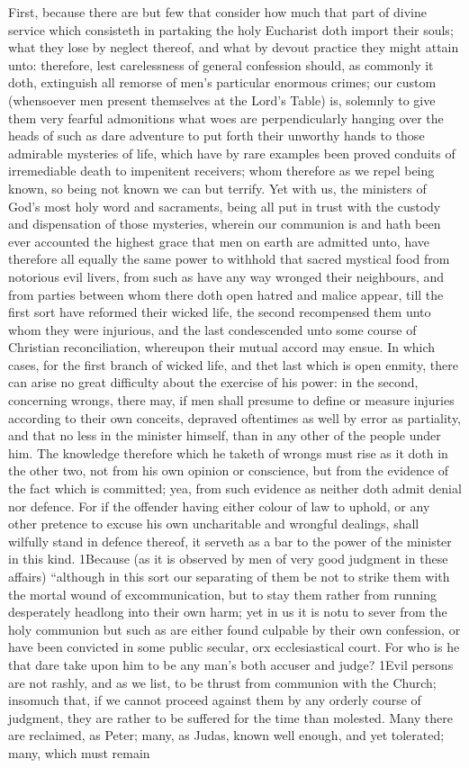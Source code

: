 First, because there are but few that consider how much that part of divine service which consisteth in partaking the holy Eucharist doth import their souls; what they lose by neglect thereof, and what by devout practice they might attain unto: therefore, lest carelessness of general confession  should, as commonly it doth, extinguish all remorse of men’s particular enormous crimes; our custom (whensoever men present themselves at the Lord’s Table) is, solemnly to give them very fearful admonitions what woes are perpendicularly hanging over the heads of such as dare adventure to put forth their unworthy hands to those admirable mysteries of life, which have by rare examples been proved conduits of irremediable death to impenitent receivers; whom therefore as we repel being known, so being not known we can but terrify. Yet with us, the ministers of God’s most holy word and sacraments, being all put in trust with the custody and dispensation of those mysteries, wherein our communion is and hath been ever accounted the highest grace that men on earth are admitted unto, have therefore all equally the same power to withhold that sacred mystical food from notorious evil livers, from such as have any way wronged their neighbours, and from parties between whom there doth open hatred and malice appear, till the first sort have reformed their wicked life, the second recompensed them unto whom they were injurious, and the last condescended unto some course of Christian reconciliation, whereupon their mutual accord may ensue. In which cases, for the first branch of wicked life, and thet last which is open enmity, there can arise no great difficulty about the exercise of his power: in the second, concerning wrongs, there may, if men shall presume to define or measure injuries according to their own conceits, depraved oftentimes as well by error as partiality, and that no less in the minister himself, than in any other of the people under him. The knowledge therefore which he taketh of wrongs must rise as it doth in the other two, not from his own opinion or conscience, but from the evidence of the fact which is committed; yea, from such evidence as neither doth admit denial nor defence. For if the offender having either colour of law to uphold, or any other pretence to excuse his own uncharitable and wrongful dealings, shall wilfully stand in defence thereof, it serveth as a bar to the power of the minister in this kind. 1Because (as it is observed by men  of very good judgment in these affairs) “although in this sort our separating of them be not to strike them with the mortal wound of excommunication, but to stay them rather from running desperately headlong into their own harm; yet in us it is notu to sever from the holy communion but such as are either found culpable by their own confession, or have been convicted in some public secular, orx ecclesiastical court. For who is he that dare take upon him to be any man’s both accuser and judge? 1Evil persons are not rashly, and as we list, to be thrust from communion with the Church; insomuch that, if we cannot proceed against them by any orderly course of judgment, they are rather to be suffered for the time than molested. Many there are reclaimed, as Peter; many, as Judas, known well enough, and yet tolerated; many, which must remain 